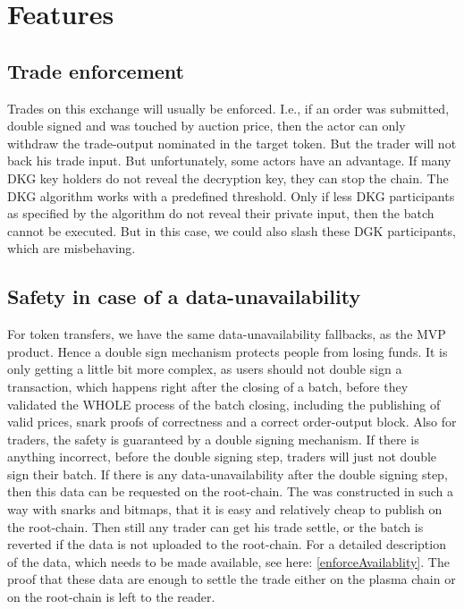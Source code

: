 \documentclass[11pt,parskip=full]{scrartcl}%
\begin{document}
\newpage
\section{Features}

\subsection{Trade enforcement}
Trades on this exchange will usually be enforced. I.e., if an order was submitted, double signed and was touched by auction price, then the actor can only withdraw the trade-output nominated in the target token. But the trader will not back his trade input. \newline 
But unfortunately, some actors have an advantage. If many DKG key holders do not reveal the decryption key, they can stop the chain. The DKG algorithm works with a predefined threshold. Only if less DKG participants as specified by the algorithm do not reveal their private input, then the batch cannot be executed. But in this case, we could also slash these DGK participants, which are misbehaving.

\subsection{Safety in case of a data-unavailability}
For token transfers, we have the same data-unavailability fallbacks, as the MVP product. Hence a double sign mechanism protects people from losing funds. It is only getting a little bit more complex, as users should not double sign a transaction, which happens right after the closing of a batch, before they validated the WHOLE process of the batch closing, including the publishing of valid prices, snark proofs of correctness and a correct order-output block.
Also for traders, the safety is guaranteed by a  double signing mechanism. If there is anything incorrect, before the double signing step, traders will just not double sign their batch.
If there is any data-unavailability after the double signing step, then this data can be requested on the root-chain. The was constructed in such a way with snarks and bitmaps, that it is easy and relatively cheap to publish on the root-chain. Then still any trader can get his trade settle, or the batch is reverted if the data is not uploaded to the root-chain. For a detailed description of the data, which needs to be made available, see here: \ref{enforceAvailablity}. The proof that these data are enough to settle the trade either on the plasma chain or on the root-chain is left to the reader.  
\end{document}
